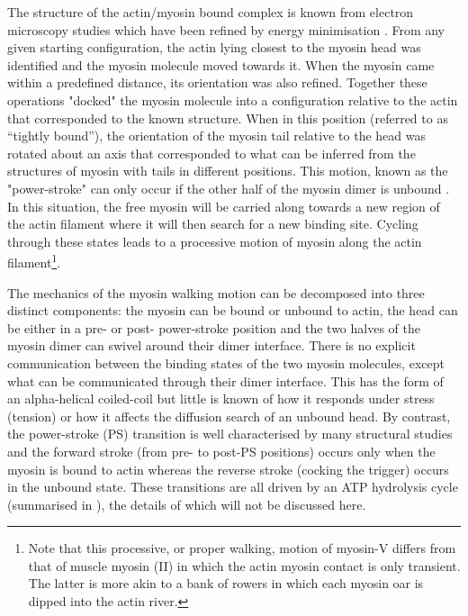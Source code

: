 The structure of the actin/myosin bound complex is known from electron
microscopy studies \cite{HolmesKCet03,HolmesKCet04} which have been refined by energy minimisation
\cite{HolmesKCet90,ChenLFet02,KawakuboTet05,LiuYet06,LorenzMet10}.
From any given starting configuration, the actin lying closest to the
myosin head was identified and the myosin molecule moved towards it.
When the myosin came within a predefined distance, its orientation was
also refined.   Together these operations "docked" the myosin molecule
into a configuration relative to the actin that corresponded to the
known structure.    When in this position (referred to as ``tightly bound''),
the orientation of the myosin tail relative to the head was rotated
about an axis that corresponded to what can be inferred from the structures
of myosin with tails in different positions.  This motion, known as 
the "power-stroke" can only occur if the other half of the myosin 
dimer is unbound \cite{ReedyMC00,DominguezRet98}.  In this situation, the free myosin will be carried 
along towards a new region of the actin filament where it will then search
for a new binding site.   Cycling through these states leads to a 
processive motion of myosin along the actin filament\footnote{
Note that this processive, or proper walking, motion of myosin-V differs
from that of muscle myosin (II) in which the actin myosin contact is
only transient.  The latter is more akin to a bank of rowers in which
each myosin oar is dipped into the actin river.}.

The mechanics of the myosin walking motion can be decomposed into three
distinct components:  the myosin can be bound or unbound to actin,
the head can be either in a pre- or post- power-stroke position and the
two halves of the myosin dimer can swivel around their dimer interface.
There is no explicit communication between the binding states of the
two myosin molecules, except what can be communicated through their
dimer interface.   This has the form of an alpha-helical coiled-coil
but little is known of how it responds under stress (tension) or how
it affects the diffusion search of an unbound head.   By contrast, the 
power-stroke (PS) transition is well characterised by many structural 
studies and the forward stroke (from pre- to post-PS positions) 
occurs only when the myosin is bound to actin whereas the reverse
stroke (cocking the trigger) occurs in the unbound state.   These
transitions are all driven by an ATP hydrolysis cycle (summarised in
), the details of which will not be discussed here.

